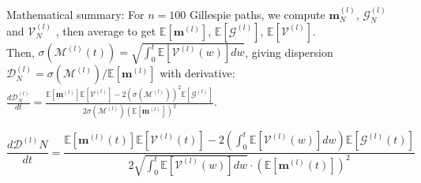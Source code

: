 \documentclass{article}
\begin{document}
Mathematical summary:
For $n=100$ Gillespie paths, we compute $\mathbf{m}_N^{(l)}$, $\mathcal{G}_N^{(l)}$ and $\mathcal{V}_N^{(l)}$ , then average to get $\mathbb{E}[\mathbf{m}^{(l)}]$, $\mathbb{E}[\mathcal{G}^{(l)}]$, $\mathbb{E}[\mathcal{V}^{(l)}]$.\\

Then, $\sigma(\mathcal{M}^{(l)}(t)) = \sqrt{\int_0^t \mathbb{E}[\mathcal{V}^{(l)}(w)]dw}$, giving dispersion $\mathcal{D}^{(l)}_N = \sigma(\mathcal{M}^{(l)})/\mathbb{E}[\mathbf{m}^{(l)}]$ with derivative: $\frac{d\mathcal{D}^{(l)}_N}{dt} = \frac{\mathbb{E}[\mathbf{m}^{(l)}] \mathbb{E}[\mathcal{V}^{(l)}] - 2(\sigma(\mathcal{M}^{(l)}))^2 \mathbb{E}[\mathcal{G}^{(l)}]}{2\sigma(\mathcal{M}^{(l)}) (\mathbb{E}[\mathbf{m}^{(l)}])^2}$.

$$\frac{d\mathcal{D}^{(l)}N}{dt} = \frac{\mathbb{E}[\mathbf{m}^{(l)}(t)] \mathbb{E}[\mathcal{V}^{(l)}(t)] - 2\left(\int_0^t \mathbb{E}[\mathcal{V}^{(l)}(w)]dw\right) \mathbb{E}[\mathcal{G}^{(l)}(t)]}{2\sqrt{\int_0^t \mathbb{E}[\mathcal{V}^{(l)}(w)]dw} \cdot (\mathbb{E}[\mathbf{m}^{(l)}(t)])^2}$$
\end{document}
